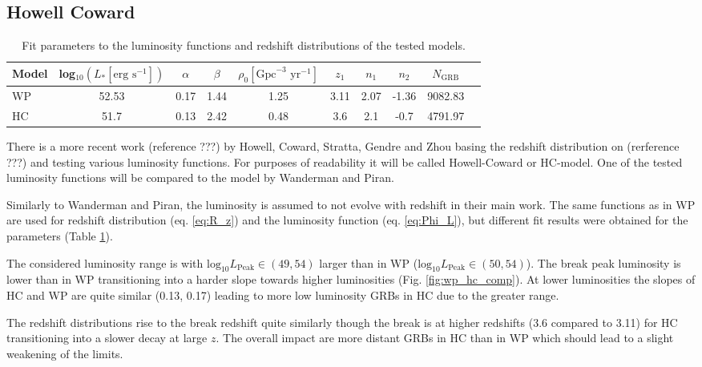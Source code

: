 \subsection{Howell Coward}
\begin{table}[h]
  \centering
  \begin{tabular}{l||c|c|c|c|c|c|c|c|c}
    Model & log$_{10}\left(L_* \left[ \text{erg} \text{ s}^{-1} \right] \right)$
& $\alpha$ & $\beta$ & $\rho_0 \left[\text{Gpc}^{-3} \text{ yr}^{-1} \right]$ &
$z_1$ & $n_1$ & $n_2$ & $N_\text{GRB}$ \\
    \hline
    WP & 52.53 & 0.17 & 1.44 & 1.25 & 3.11 & 2.07 & -1.36 & 9082.83\\
    HC & 51.7 & 0.13 & 2.42 & 0.48 & 3.6 & 2.1 & -0.7 & 4791.97\\
  \end{tabular}
  \caption{Fit parameters to the luminosity functions and redshift
distributions of the tested models.}
  \label{tab:grb_model_params}
\end{table}
There is a more recent work (reference ???) by Howell, Coward, Stratta,
Gendre and Zhou basing the redshift distribution on
(rerference ???) and testing various luminosity functions. For purposes of
readability it will be called Howell-Coward or HC-model. 
One of the tested luminosity functions
will be compared to the model by Wanderman and
Piran. 

Similarly to Wanderman and Piran, the luminosity is assumed to not evolve
with redshift in their main work.
The same functions as in WP are used for redshift distribution (eq. 
\ref{eq:R_z}) and the
luminosity function (eq. \ref{eq:Phi_L}), but different fit results
were obtained for the parameters (Table \ref{tab:grb_model_params}).

The considered luminosity range is with $\text{log}_{10} L_\text{Peak} \in
\left( 49, 54 \right)$ larger than in WP ($\text{log}_{10} L_\text{Peak} \in
\left( 50, 54 \right)$). The break peak luminosity is lower
than in WP transitioning into a harder slope towards higher luminosities (Fig.
\ref{fig:wp_hc_comp}). At lower luminosities the slopes of HC and WP are
quite similar (0.13, 0.17) leading to more low luminosity GRBs in HC due to the 
greater range.

The redshift distributions rise to the break redshift quite similarly though 
the break is at higher redshifts (3.6 compared to 3.11) for HC transitioning
into a slower decay at large $z$. The overall impact are more distant GRBs in
HC than in WP which should lead to a slight weakening of the limits.

